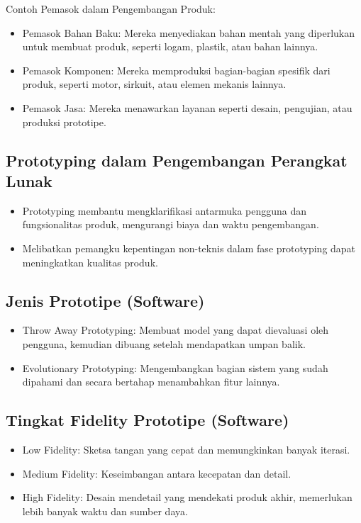 \documentclass{article}
\begin{document}
Contoh Pemasok dalam Pengembangan Produk:
\begin{itemize}
    \item Pemasok Bahan Baku: Mereka menyediakan bahan mentah yang diperlukan untuk membuat produk, seperti logam, plastik, atau bahan lainnya.
    \item Pemasok Komponen: Mereka memproduksi bagian-bagian spesifik dari produk, seperti motor, sirkuit, atau elemen mekanis lainnya.
    \item Pemasok Jasa: Mereka menawarkan layanan seperti desain, pengujian, atau produksi prototipe.
\end{itemize}

\subsection{Prototyping dalam Pengembangan Perangkat Lunak}
\begin{itemize}
    \item Prototyping membantu mengklarifikasi antarmuka pengguna dan fungsionalitas produk, mengurangi biaya dan waktu pengembangan.
    \item Melibatkan pemangku kepentingan non-teknis dalam fase prototyping dapat meningkatkan kualitas produk.
\end{itemize}

\subsection{Jenis Prototipe (Software)}
\begin{itemize}
    \item Throw Away Prototyping: Membuat model yang dapat dievaluasi oleh pengguna, kemudian dibuang setelah mendapatkan umpan balik.
    \item Evolutionary Prototyping: Mengembangkan bagian sistem yang sudah dipahami dan secara bertahap menambahkan fitur lainnya.
\end{itemize}

\subsection{Tingkat Fidelity Prototipe (Software)}
\begin{itemize}
    \item Low Fidelity: Sketsa tangan yang cepat dan memungkinkan banyak iterasi.
    \item Medium Fidelity: Keseimbangan antara kecepatan dan detail.
    \item High Fidelity: Desain mendetail yang mendekati produk akhir, memerlukan lebih banyak waktu dan sumber daya.
\end{itemize}
\end{document}
